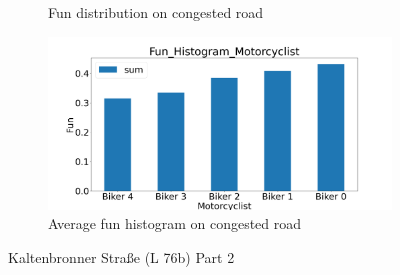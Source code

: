 \begin{figure}[H]
\begin{subfigure}[b]{0.45\textwidth}
        \caption{Fun distribution on congested road}
    \end{subfigure}
    \hfill
    \begin{subfigure}[b]{0.45\textwidth}
        \centering
        \includegraphics[width=1.0\textwidth]{images/Kaltenbronner/Kaltenbronner_Fun_Histogram_congested.png}
        \caption{Average fun histogram on congested road}
    \end{subfigure}
    \caption{Kaltenbronner Straße (L 76b) Part 2}
\end{figure}

